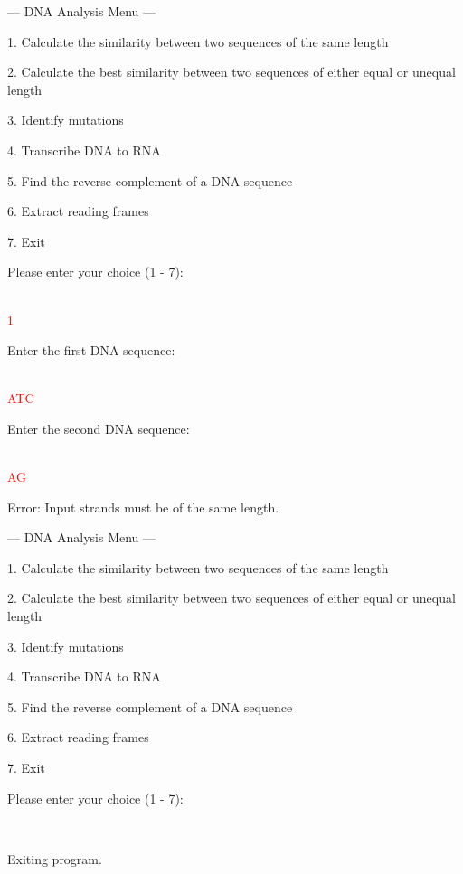 \begin{sample}

    --- DNA Analysis Menu ---
    
    1. Calculate the similarity between two sequences of the same length
    
    2. Calculate the best similarity between two sequences of either equal or unequal length
    
    3. Identify mutations
    
    4. Transcribe DNA to RNA
    
    5. Find the reverse complement of a DNA sequence
    
    6. Extract reading frames
    
    7. Exit
    
    Please enter your choice (1 - 7): 
    
    \\\textcolor{red}{1}

    Enter the first DNA sequence:

    \\\textcolor{red}{ATC}

    Enter the second DNA sequence: 

    \\\textcolor{red}{AG}

    Error: Input strands must be of the same length.
    
    --- DNA Analysis Menu ---
    
    1. Calculate the similarity between two sequences of the same length
   
    2. Calculate the best similarity between two sequences of either equal or unequal length
    
    3. Identify mutations
    
    4. Transcribe DNA to RNA
    
    5. Find the reverse complement of a DNA sequence
    
    6. Extract reading frames
    
    7. Exit
    
    Please enter your choice (1 - 7): 
    
    \\\textcolor{red}{}
    
    Exiting program.
\end{sample}


